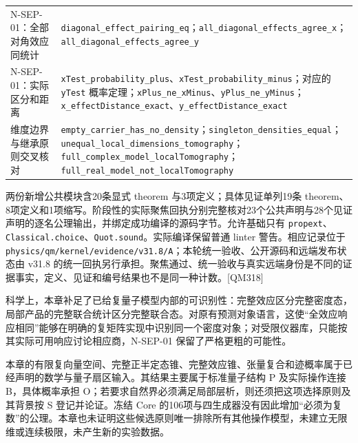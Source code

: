 \documentclass[
  11pt,
  oneside]{book}
\begin{document}
\begin{longtable}[]{@{}
  >{\raggedright\arraybackslash}p{}
  >{\raggedright\arraybackslash}p{}@{}}
N-SEP-01：全部对角效应同统计 &
\texttt{diagonal\_\allowbreak effect\_\allowbreak pairing\_\allowbreak eq}；\texttt{all\_\allowbreak diagonal\_\allowbreak effects\_\allowbreak agree\_\allowbreak x}；\texttt{all\_\allowbreak diagonal\_\allowbreak effects\_\allowbreak agree\_\allowbreak y} \\
N-SEP-01：实际区分和距离 &
\texttt{xTest\_\allowbreak probability\_\allowbreak plus}、\allowbreak \texttt{xTest\_\allowbreak probability\_\allowbreak minus}；对应的
\texttt{yTest}
概率定理；\texttt{xPlus\_\allowbreak ne\_\allowbreak xMinus}、\allowbreak \texttt{yPlus\_\allowbreak ne\_\allowbreak yMinus}；\texttt{x\_\allowbreak effectDistance\_\allowbreak exact}、\allowbreak \texttt{y\_\allowbreak effectDistance\_\allowbreak exact} \\
维度边界与继承原则交叉核对 &
\texttt{empty\_\allowbreak carrier\_\allowbreak has\_\allowbreak no\_\allowbreak density}；\texttt{singleton\_\allowbreak densities\_\allowbreak equal}；\texttt{unequal\_\allowbreak local\_\allowbreak dimensions\_\allowbreak tomography}；\texttt{full\_\allowbreak complex\_\allowbreak model\_\allowbreak localTomography}；\texttt{full\_\allowbreak real\_\allowbreak model\_\allowbreak not\_\allowbreak localTomography} \\
\end{longtable}

两份新增公共模块含20条显式 theorem 与3项定义；具体见证单列19条
theorem、8项定义和1项缩写。阶段性的实际聚焦回执分别完整核对23个公共声明与28个见证声明的逐名公理输出，并绑定成功编译的源码字节。允许基础只有
\texttt{propext}、\allowbreak \texttt{Classical.choice}、\allowbreak \texttt{Quot.sound}。实际编译保留普通
linter 警告。相应记录位于
\texttt{physics/qm/kernel/evidence/v31.8/A}；本轮统一验收、公开源码和远端发布状态由
v31.8
的统一回执另行承担。聚焦通过、统一验收与真实远端身份是不同的证据事实，定义、见证和编号结果也不是同一种计数。{[}QM318{]}

科学上，本章补足了已给复量子模型内部的可识别性：完整效应区分完整密度态，局部产品的完整联合统计区分完整联合态。对原有预测对象语言，这使``全效应响应相同''能够在明确的复矩阵实现中识别同一个密度对象；对受限仪器库，只能按其实际可用响应讨论相应商，N-SEP-01
保留了严格更粗的可能性。

本章的有限复向量空间、完整正半定态锥、完整效应锥、张量复合和迹概率属于已经声明的数学与量子扇区输入。其结果主要属于标准量子结构
P 及实际操作连接 B，具体概率承担
O；若要求自然界必须满足局部层析，则还须把这项选择原则及其背景按 S
登记并论证。冻结 Core
的106项与四生成器没有因此增加``必须为复数''的公理。本章也未证明这些候选原则唯一排除所有其他操作模型，未建立无限维或连续极限，未产生新的实验数据。
\end{document}
